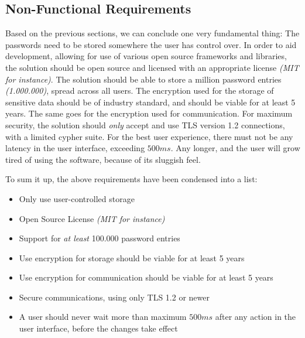 		\subsection*{Non-Functional Requirements}
			Based on the previous sections, we can conclude one very fundamental thing: The passwords need to be stored somewhere the user has control over. In order to aid development, allowing for use of various open source frameworks and libraries, the solution should be open source and licensed with an appropriate license \emph{(MIT for instance)}. The solution should be able to store a million password entries \emph{(1.000.000)}, spread across all users. The encryption used for the storage of sensitive data should be of industry standard, and should be viable for at least 5 years. The same goes for the encryption used for communication. For maximum security, the solution should \emph{only} accept and use TLS version 1.2 connections, with a limited cypher suite. For the best user experience, there must not be any latency in the user interface, exceeding $500ms$. Any longer, and the user will grow tired of using the software, because of its sluggish feel.

			To sum it up, the above requirements have been condensed into a list:
			\vspace{-3ex}\begin{itemize}
				\setlength\itemsep{0.1em}
				\item Only use user-controlled storage
				\item Open Source License \emph{(MIT for instance)}
				\item Support for \emph{at least} 100.000 password entries
				\item Use encryption for storage should be viable for at least 5 years
				\item Use encryption for communication should be viable for at least 5 years
				\item Secure communications, using only TLS 1.2 or newer
				\item A user should never wait more than maximum $500ms$ after any action in the user interface, before the changes take effect
			\end{itemize}